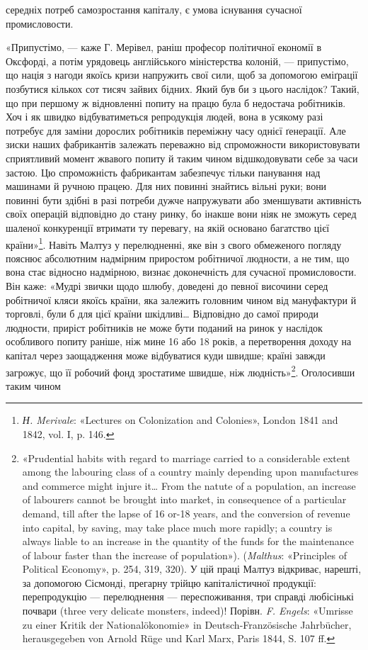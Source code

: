 \parcont{}  %
середніх потреб самозростання капіталу, є умова існування сучасної
промисловости.

«Припустімо, — каже Г. Мерівел, раніш професор політичної
економії в Оксфорді, а потім урядовець англійського міністерства
колоній, — припустімо, що нація з нагоди якоїсь кризи напружить
свої сили, щоб за допомогою еміґрації позбутися кількох сот
тисяч зайвих бідних. Який був би з цього наслідок? Такий, що
при першому ж відновленні попиту на працю була б недостача
робітників. Хоч і як швидко відбуватиметься репродукція людей,
вона в усякому разі потребує для заміни дорослих робітників
переміжну часу однієї ґенерації. Але зиски наших фабрикантів
залежать переважно від спроможности використовувати сприятливий
момент жвавого попиту й таким чином відшкодовувати
себе за часи застою. Цю спроможність фабрикантам забезпечує
тільки панування над машинами й ручною працею. Для них
повинні знайтись вільні руки; вони повинні бути здібні в разі
потреби дужче напружувати або зменшувати активність своїх
операцій відповідно до стану ринку, бо інакше вони ніяк не зможуть
серед шаленої конкуренції втримати ту перевагу, на якій
основано багатство цієї країни»\footnote{
\emph{Н. Merivale}: «Lectures on Colonization and Colonies», London 1841
and 1842, vol. I, p. 146.
}. Навіть Малтуз у перелюдненні,
яке він з свого обмеженого погляду пояснює абсолютним
надмірним приростом робітничої людности, а не тим, що вона
стає відносно надмірною, визнає доконечність для сучасної промисловости.
Він каже: «Мудрі звички щодо шлюбу, доведені
до певної височини серед робітничої кляси якоїсь країни, яка
залежить головним чином від мануфактури й торговлі, були б
для цієї країни шкідливі\dots{} Відповідно до самої природи людности,
приріст робітників не може бути поданий на ринок у наслідок
особливого попиту раніше, ніж мине 16 або 18 років, а перетворення
доходу на капітал через заощадження може відбуватися
куди швидше; країні завжди загрожує, що її робочий фонд зростатиме
швидше, ніж людність»\footnote{
«Prudential habits with regard to marriage carried to a considerable
extent among the labouring class of a country mainly depending upon manufactures
and commerce might injure it\dots{} From the natute of a population,
an increase of labourers cannot be brought into market, in consequence
of a particular demand, till after the lapse of 16 or-18 years, and the conversion
of revenue into capital, by saving, may take place much more rapidly;
a country is always liable to an increase in the quantity of the funds
for the maintenance of labour faster than the increase of population»).
(\emph{Malthus}: «Principles of Political Economy», p. 254, 319, 320). У цій праці
Малтуз відкриває, нарешті, за допомогою Сісмонді, прегарну трійцю капіталістичної
продукції: перепродукцію — перелюднення — переспоживання,
три справді любісінькі почвари (three very delicate monsters, indeed)!
Порівн. \emph{F. Engels}: «Umrisse zu einer Kritik der Nationalökonomie» in
Deutsch-Französische Jahrbücher, herausgegeben von Arnold Rüge
und Karl Marx, Paris 1844, S. 107 ff.
}. Оголосивши таким чином
